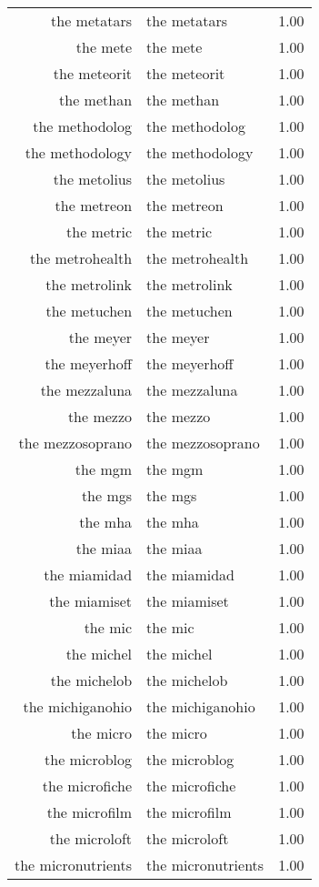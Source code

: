 \begin{table}[ht]
\begin{tabular}{rlr}
  the metatars & the metatars & 1.00 \\ 
  the mete & the mete & 1.00 \\ 
  the meteorit & the meteorit & 1.00 \\ 
  the methan & the methan & 1.00 \\ 
  the methodolog & the methodolog & 1.00 \\ 
  the methodology & the methodology & 1.00 \\ 
  the metolius & the metolius & 1.00 \\ 
  the metreon & the metreon & 1.00 \\ 
  the metric & the metric & 1.00 \\ 
  the metrohealth & the metrohealth & 1.00 \\ 
  the metrolink & the metrolink & 1.00 \\ 
  the metuchen & the metuchen & 1.00 \\ 
  the meyer & the meyer & 1.00 \\ 
  the meyerhoff & the meyerhoff & 1.00 \\ 
  the mezzaluna & the mezzaluna & 1.00 \\ 
  the mezzo & the mezzo & 1.00 \\ 
  the mezzosoprano & the mezzosoprano & 1.00 \\ 
  the mgm & the mgm & 1.00 \\ 
  the mgs & the mgs & 1.00 \\ 
  the mha & the mha & 1.00 \\ 
  the miaa & the miaa & 1.00 \\ 
  the miamidad & the miamidad & 1.00 \\ 
  the miamiset & the miamiset & 1.00 \\ 
  the mic & the mic & 1.00 \\ 
  the michel & the michel & 1.00 \\ 
  the michelob & the michelob & 1.00 \\ 
  the michiganohio & the michiganohio & 1.00 \\ 
  the micro & the micro & 1.00 \\ 
  the microblog & the microblog & 1.00 \\ 
  the microfiche & the microfiche & 1.00 \\ 
  the microfilm & the microfilm & 1.00 \\ 
  the microloft & the microloft & 1.00 \\ 
  the micronutrients & the micronutrients & 1.00 \\ 

\end{tabular}
\end{table}
